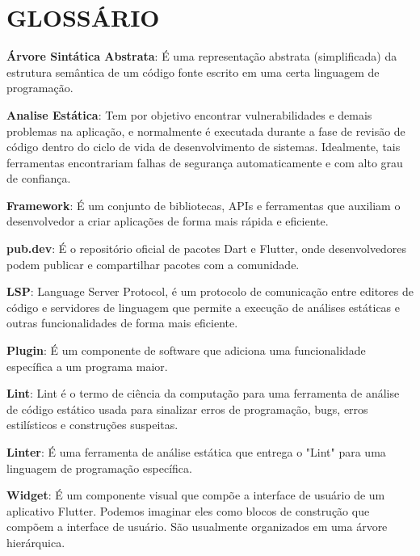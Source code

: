 



\chapter*{GLOSSÁRIO}

{ \setlength{\parindent}{0pt} %

\textbf{Árvore Sintática Abstrata}: É uma representação abstrata (simplificada) da estrutura semântica de um código fonte escrito em uma certa linguagem de programação.

\textbf{Analise Estática}: Tem por objetivo encontrar vulnerabilidades e demais problemas na aplicação, e normalmente é executada durante a fase de revisão de código dentro do ciclo de vida de desenvolvimento de sistemas. Idealmente, tais ferramentas encontrariam falhas de segurança automaticamente e com alto grau de confiança.

\textbf{Framework}: É um conjunto de bibliotecas, APIs e ferramentas que auxiliam o desenvolvedor a criar aplicações de forma mais rápida e eficiente.

\textbf{pub.dev}: É o repositório oficial de pacotes Dart e Flutter, onde desenvolvedores podem publicar e compartilhar pacotes com a comunidade.

\textbf{LSP}: Language Server Protocol, é um protocolo de comunicação entre editores de código e servidores de linguagem que permite a execução de análises estáticas e outras funcionalidades de forma mais eficiente.

\textbf{Plugin}: É um componente de software que adiciona uma funcionalidade específica a um programa maior.

\textbf{Lint}: Lint é o termo de ciência da computação para uma ferramenta de análise de código estático usada para sinalizar erros de programação, bugs, erros estilísticos e construções suspeitas.

\textbf{Linter}: É uma ferramenta de análise estática que entrega o "Lint" para uma linguagem de programação específica.

\textbf{Widget}: É um componente visual que compõe a interface de usuário de um aplicativo Flutter. Podemos imaginar eles como blocos de construção que compõem a interface de usuário. São usualmente organizados em uma árvore hierárquica.

} %
